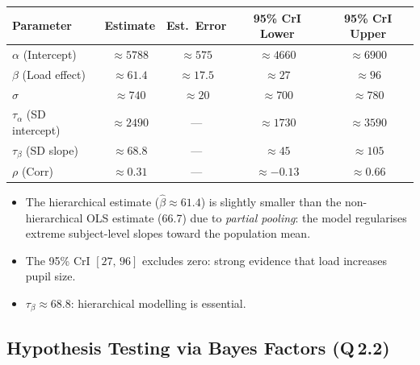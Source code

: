 \documentclass[12pt,a4paper]{article}
\begin{document}
\begin{tcolorbox}[resultbox, title={Hierarchical Model Estimates}]
\begin{center}
\renewcommand{\arraystretch}{1.4}
\begin{tabular}{lcccc}
  \toprule
  \textbf{Parameter} & \textbf{Estimate} & \textbf{Est.\ Error} & \textbf{95\% CrI Lower} & \textbf{95\% CrI Upper} \\
  \midrule
  $\alpha$ (Intercept)          & $\approx5788$ & $\approx575$  & $\approx4660$ & $\approx6900$ \\
  $\beta$ (Load effect)         & $\approx61.4$ & $\approx17.5$ & $\approx27$   & $\approx96$   \\
  $\sigma$                      & $\approx740$  & $\approx20$   & $\approx700$  & $\approx780$  \\
  $\tau_\alpha$ (SD intercept)  & $\approx2490$ & ---           & $\approx1730$ & $\approx3590$ \\
  $\tau_\beta$ (SD slope)       & $\approx68.8$ & ---           & $\approx45$   & $\approx105$  \\
  $\rho$ (Corr)                 & $\approx0.31$ & ---           & $\approx-0.13$& $\approx0.66$ \\
  \bottomrule
\end{tabular}
\end{center}
\end{tcolorbox}

\begin{itemize}[leftmargin=1.5cm, itemsep=3pt]
  \item The hierarchical estimate ($\hat{\beta}\approx61.4$) is slightly smaller than the non-hierarchical OLS estimate (66.7) due to \textit{partial pooling}: the model regularises extreme subject-level slopes toward the population mean.
  \item The 95\% CrI $[27,\,96]$ excludes zero: strong evidence that load increases pupil size.
  \item $\tau_\beta\approx68.8$: hierarchical modelling is essential.
\end{itemize}

\subsection{Hypothesis Testing via Bayes Factors (Q\,2.2)}
\end{document}
